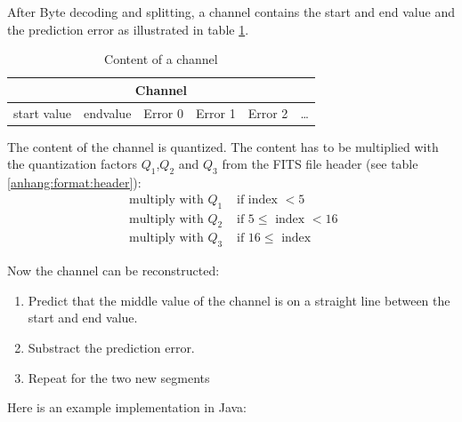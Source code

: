 After Byte decoding and splitting, a channel contains the start and end value and the prediction error as illustrated in table \ref{anhang:format:prediction:content}.
\begin{table}[!htbp]
	\center
	\begin{tabular}{|c|c|c|c|c|c|}
		\hline
		\multicolumn{6}{|c|}{Channel}\\\hline
		start value & endvalue & Error 0 & Error 1 & Error 2 & \ldots \\\hline
	\end{tabular}
	\caption{Content of a channel}
	\label{anhang:format:prediction:content}
\end{table}

The content of the channel is quantized. The content has to be multiplied with the quantization factors $Q_1$,$Q_2$ and $Q_3$ from the FITS file header (see table \ref{anhang:format:header}):
\begin{equation}
\begin{split}
	\mbox{ multiply with }Q_1 & \mbox{ if index } < 5\\
	\mbox{ multiply with }Q_2 & \mbox{ if } 5 \leq \mbox{ index } < 16\\
	\mbox{ multiply with }Q_3 & \mbox{ if } 16 \leq \mbox{ index }
\end{split}
\end{equation}

Now the channel can be reconstructed:
\begin{enumerate}
	\item Predict that the middle value of the channel is on a straight line between the start and end value.
	\item Substract the prediction error.
	\item Repeat for the two new segments
\end{enumerate}

Here is an example implementation in Java:


